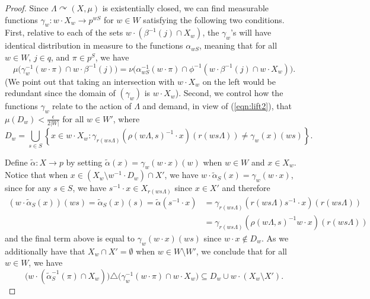 \documentclass[12pt]{amsart}
\theoremstyle{definition}
\newcommand{\acts}{\curvearrowright}
\newcommand{\symd}{\triangle}
\begin{document}
\begin{proof}
Since $\Lambda \acts (X, \mu)$ is existentially closed, we can find measurable functions $\gamma_w : w \cdot X_w \rightarrow p^{w S}$ for $w \in W$ satisfying the following two conditions. First, relative to each of the sets $w \cdot (\beta^{-1}(j) \cap X_w)$, the $\gamma_w$'s will have identical distribution in measure to the functions $\alpha_{w S}$, meaning that for all $w \in W$, $j \in q$, and $\pi \in p^S$, we have
\begin{equation} \label{eqn:lift3}
\mu \Big( \gamma_w^{-1}(w \cdot \pi) \cap w \cdot \beta^{-1}(j) \Big) = \nu \Big( \alpha_{w S}^{-1}(w \cdot \pi) \cap \phi^{-1}(w \cdot \beta^{-1}(j) \cap w \cdot X_w) \Big).
\end{equation}
(We point out that taking an intersection with $w \cdot X_w$ on the left would be redundant since the domain of $(\gamma_w)$ is $w \cdot X_w$). Second, we control how the functions $\gamma_w$ relate to the action of $\Lambda$ and demand, in view of (\ref{eqn:lift2}), that $\mu(D_w) < \frac{\epsilon}{2|W|}$ for all $w \in W'$, where
\begin{equation*}
D_w = \bigcup_{s \in S} \left\{x \in w \cdot X_w:  \gamma_{r(w s \Lambda)}(\rho(w \Lambda, s)^{-1} \cdot x)(r(w s \Lambda)) \neq \gamma_w(x)(w s)\right\}.
\end{equation*}

Define $\tilde{\alpha} : X \rightarrow p$ by setting $\tilde{\alpha}(x) = \gamma_w(w \cdot x)(w)$ when $w \in W$ and $x \in X_w$. Notice that when $x \in (X_w \setminus w^{-1} \cdot D_w) \cap X'$, we have $w \cdot \tilde{\alpha}_S(x) = \gamma_w(w \cdot x)$, since for any $s \in S$, we have $s^{-1} \cdot x \in X_{r(w s \Lambda)}$ since $x \in X'$ and therefore
\begin{align*}
(w \cdot \tilde{\alpha}_S(x))(w s) = \tilde{\alpha}_S(x)(s) = \tilde{\alpha}(s^{-1} \cdot x) & = \gamma_{r(w s \Lambda)}(r(w s \Lambda) s^{-1} \cdot x)(r(w s \Lambda))\\
 & = \gamma_{r(w s \Lambda)}(\rho(w \Lambda, s)^{-1} w \cdot x)(r(w s \Lambda))
\end{align*}
and the final term above is equal to $\gamma_w(w \cdot x)(w s)$ since $w \cdot x \not\in D_w$. As we additionally have that $X_w \cap X' = \emptyset$ when $w \in W \setminus W'$, we conclude that for all $w \in W$, we have
\begin{equation} \label{eqn:lift4}
\Big( w \cdot ( \tilde{\alpha}_S^{-1}(\pi) \cap X_w ) \Big) \symd \Big( \gamma_w^{-1}(w \cdot \pi) \cap w \cdot X_w \Big) \subseteq D_w \cup w \cdot (X_w \setminus X').
\end{equation}


\end{proof}
\end{document}

